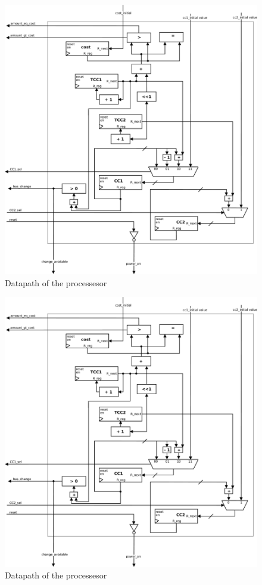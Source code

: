 \begin{figure}
\centering
\includegraphics[width=1.0\textwidth]{fig/datapath.pdf}
\caption{Datapath of the processesor}
\label{fig:datapath}
\end{figure}

\begin{figure}
\centering
\includegraphics[width=1.0\textwidth]{fig/datapath.pdf}
\caption{Datapath of the processesor}
\label{fig:test1}
\end{figure}